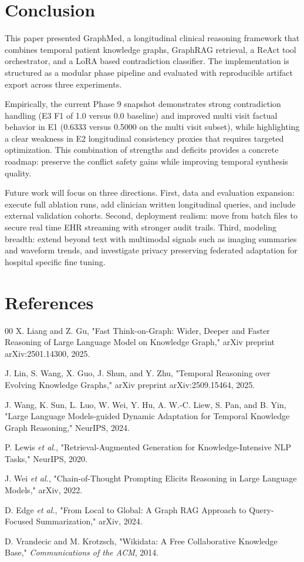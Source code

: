 \documentclass[conference]{IEEEtran}
\begin{document}
\section{Conclusion}
This paper presented GraphMed, a longitudinal clinical reasoning framework that combines temporal patient knowledge graphs, GraphRAG retrieval, a ReAct tool orchestrator, and a LoRA based contradiction classifier. The implementation is structured as a modular phase pipeline and evaluated with reproducible artifact export across three experiments.

Empirically, the current Phase 9 snapshot demonstrates strong contradiction handling (E3 F1 of 1.0 versus 0.0 baseline) and improved multi visit factual behavior in E1 (0.6333 versus 0.5000 on the multi visit subset), while highlighting a clear weakness in E2 longitudinal consistency proxies that requires targeted optimization. This combination of strengths and deficits provides a concrete roadmap: preserve the conflict safety gains while improving temporal synthesis quality.

Future work will focus on three directions. First, data and evaluation expansion: execute full ablation runs, add clinician written longitudinal queries, and include external validation cohorts. Second, deployment realism: move from batch files to secure real time EHR streaming with stronger audit trails. Third, modeling breadth: extend beyond text with multimodal signals such as imaging summaries and waveform trends, and investigate privacy preserving federated adaptation for hospital specific fine tuning.

\section*{References}

\begin{thebibliography}{00}
 X. Liang and Z. Gu, "Fast Think-on-Graph: Wider, Deeper and Faster Reasoning of Large Language Model on Knowledge Graph," arXiv preprint arXiv:2501.14300, 2025.

 J. Lin, S. Wang, X. Guo, J. Shun, and Y. Zhu, "Temporal Reasoning over Evolving Knowledge Graphs," arXiv preprint arXiv:2509.15464, 2025.

 J. Wang, K. Sun, L. Luo, W. Wei, Y. Hu, A. W.-C. Liew, S. Pan, and B. Yin, "Large Language Models-guided Dynamic Adaptation for Temporal Knowledge Graph Reasoning," NeurIPS, 2024.

 P. Lewis \textit{et al.}, "Retrieval-Augmented Generation for Knowledge-Intensive NLP Tasks," NeurIPS, 2020.

 J. Wei \textit{et al.}, "Chain-of-Thought Prompting Elicits Reasoning in Large Language Models," arXiv, 2022.

 D. Edge \textit{et al.}, "From Local to Global: A Graph RAG Approach to Query-Focused Summarization," arXiv, 2024.

 D. Vrandecic and M. Krotzsch, "Wikidata: A Free Collaborative Knowledge Base," \textit{Communications of the ACM}, 2014.

\end{thebibliography}
\end{document}
